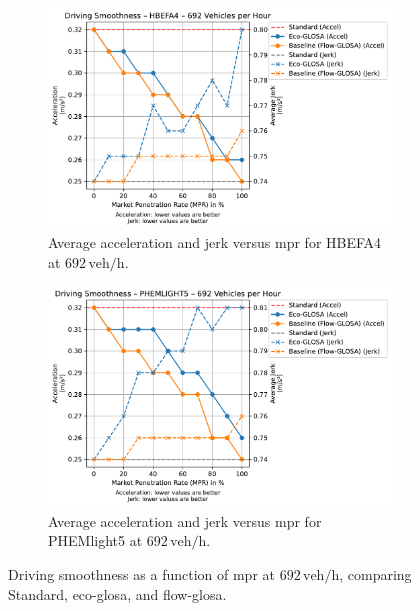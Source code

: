 \begin{figure}[htb]
  \centering
  \begin{subfigure}[b]{0.45\textwidth}
    \includegraphics[width=\textwidth]{data/img/DrivingSmoothness/DrivingSmoothness_HBEFA4_Cars692.pdf}
    \caption{Average acceleration and jerk versus \ac{mpr} for HBEFA4 at $692\,\mathrm{veh/h}$.}
    \label{fig:Smoothness_HBEFA4_692}
  \end{subfigure}\hfill
  \begin{subfigure}[b]{0.45\textwidth}
    \includegraphics[width=\textwidth]{data/img/DrivingSmoothness/DrivingSmoothness_PHEMLIGHT5_Cars692.pdf}
    \caption{Average acceleration and jerk versus \ac{mpr} for PHEMlight5 at $692\,\mathrm{veh/h}$.}
    \label{fig:Smoothness_PHEMlight5_692}
  \end{subfigure}
  \caption{Driving smoothness as a function of \ac{mpr} at $692\,\mathrm{veh/h}$, comparing Standard, \ac{eco-glosa}, and \ac{flow-glosa}.}
  \label{fig:Smoothness_692}
\end{figure}

